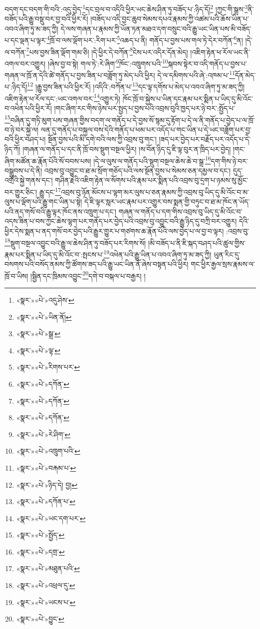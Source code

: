 བདག་དང་བདག་གི་བའི་:འདུ་བྱེད་\footnote{«སྣར་»«པེ་»འདུ་ཤེས་}དང་བྲལ་བ་འདིའི་ཕྱིར་ཡང་ཆེས་ཤིན་ཏུ་བཟོད་པ་:ཉིད་དོ།\footnote{«སྣར་»«པེ་»ཡིན་ནོ།} །ཀྱང་གི་སྒྲས་\footnote{«སྣར་»«པེ་»སྒྲ་}ནི་བཟོད་པའི་རྒྱུ་བསྡུ་བར་བྱ་བའི་ཕྱིར་རོ། །བཟོད་པ་འདི་བྱང་ཆུབ་སེམས་དཔའ་རྣམས་ཀྱི་འཚམ་པའི་ཆོས་ཡིན་པ་འབའ་ཞིག་ཏུ་མ་ཟད་ཀྱི། དེ་ལས་གཞན་པ་རྣམས་ཀྱི་ཡོན་ཏན་མཐའ་དག་བསྲུང་བའི་རྒྱུ་ཡང་ཡིན་པས་མི་བཟོད་པ་དང་ལྡན་པ་ལྟར་\footnote{«སྣར་»«པེ་»ལྟ་}ཁྲོ་བ་ལས་ལྡོག་པར་:རིག་པར་\footnote{«སྣར་»«པེ་»རིགས་པར་}འཆད་པ་ནི། གནོད་པ་བྱས་པས་གལ་ཏེ་དེར་བཀོན་\footnote{«སྣར་»«པེ་»དཀོན་}ན། །དེ་ལ་བཀོན་\footnote{«སྣར་»«པེ་»དཀོན་}པས་བྱས་ཟིན་ལྡོག་གམ་ཅི། །དེ་ཕྱིར་དེ་བཀོན་\footnote{«སྣར་»«པེ་»དཀོན་}ངེས་པར་འདིར་དོན་མེད། །འཇིག་རྟེན་ཕ་རོལ་ཡང་ནི་འགལ་བར་འགྱུར། །ཞེས་བྱ་བ་སྟེ། གལ་ཏེ་:རེ་ཞིག་\footnote{«སྣར་»«པེ་»རེ་ཤིག་}ཁོང་:འཁྲུགས་པའི་\footnote{«སྣར་»«པེ་»འཁྲུག་པའི་}སྐབས་སྟེར་བ་འདི་གནོད་པ་བྱས་པ་གཞན་ལ་ཁྲོ་ན་དེའི་ཚེ་གནོད་པ་བྱས་ཟིན་པ་བཟློག་ཏུ་མེད་པའི་ཕྱིར། དེ་ལ་དམིགས་པའི་ཞེ་:འཁམ་པ་\footnote{«སྣར་»«པེ་»བརྐམ་པ་}དོན་མེད་པ་:ཉིད་དོ།\footnote{«སྣར་»«པེ་»ཉིད་དེ། བྱ།} །རྒྱུ་བྱས་ཟིན་པའི་ཕྱིར་རོ། །འདིའི་:བཀོན་པ་\footnote{«སྣར་»«པེ་»དཀོན་པ་}དང་ལྟ་དགོས་པ་མེད་པ་འབའ་ཞིག་ཏུ་མ་ཟད་ཀྱི། འཇིག་རྟེན་ཕ་རོལ་དང་:ཡང་འགལ་བར་\footnote{«སྣར་»«པེ་»ཡང་དག་པར་}འགྱུར་ཏེ། ཁོང་ཁྲོ་བ་སྐྱེས་པ་ཡིན་དང་རྣམ་པར་སྨིན་པ་ཡིད་དུ་མི་འོང་བ་འཕེན་པའི་ཕྱིར་རོ། །གང་ཞིག་རང་གིས་ཉེས་པར་སྤྱད་པ་བྱས་པའི་འབྲས་བུའི་ཁྱད་པར་ཉེ་བར་:སྤྱོད་པ་\footnote{«སྣར་»«པེ་»སྤྱོད་}བཞིན་དུ་གཏི་མུག་པས་གཞན་གྱིས་བདག་ལ་གནོད་པ་དེ་བྱས་སོ་སྙམ་དུ་རྟོག་པ་དེ་ལ་ནི་གནོད་པ་བྱེད་པ་ལ་ཁྲོ་བ་ཉེ་བར་སྐྱེ་ལ། ལན་དུ་གནོད་པ་བསྐྱལ་བས་དེའི་གནོད་པ་ཕམ་པར་འདོད་པ་གང་ཡིན་པ་དེ་ཡང་བཟློག་པར་བྱ་བའི་ཕྱིར་བཤད་པ། སྔོན་བྱས་པའི་མི་དགེ་བའི་ལས་ཀྱི་འབྲས་བུ་གང་། །ཟད་པར་བྱེད་པར་བརྗོད་པར་འདོད་པ་དེ་ཉིད་ཀོ། །གཞན་ལ་གནོད་པ་དང་ནི་ཁྲོ་བས་སྡུག་བསྔལ་ཕྱིར། །ས་བོན་ཉིད་དུ་ཇི་ལྟ་བུར་ན་ཁྲིད་པར་བྱེད། །གང་ཞིག་མཚོན་ཆ་རྣོན་པོའི་སོ་བབས་པས། །དེ་ལ་ལུས་ལ་གནོད་པའི་སྡུག་བསྔལ་ཆེས་ཆེ་བ་སྒྲ་\footnote{«སྣར་»«པེ་»དགྲ་}དག་གིས་ཉེ་བར་བསྒྲུབས་པ་དེ་ནི། འབྲས་བུ་འབྱུང་བ་ཐ་མ་སྲོག་གཅོད་པའི་ལས་སྔོན་བྱས་པ་སེམས་ཅན་དམྱལ་བ་དང་། དུད་འགྲོའི་སྐྱེ་གནས་དང་། གཤིན་རྗེའི་འཇིག་རྟེན་ལ་སོགས་པའི་རྣམ་པར་སྨིན་པའི་འབྲས་བུ་དྲག་པ་ཉམས་སུ་མྱོང་བར་གྱུར་ཅིང་། རྒྱུ་དང་\footnote{«སྣར་»«པེ་»མཐུན་པའི་}འབྲས་བུ་ཉོན་མོངས་པ་ལྷག་མར་ལུས་པ་ཅན་རྣམས་ཀྱི་འབྲས་བུ་ཡིད་དུ་མི་འོང་བ་མ་ལུས་པ་ལྡོག་པའི་རྒྱུ་གང་ཡིན་པ་སྟེ། དེ་ཇི་ལྟར་སླར་ཡང་རྣམ་པར་འགྱུར་བས་སྨན་གྱི་བཏུང་བ་ཐ་མ་ཁོང་ན་ཡོད་པའི་ནད་གསོ་བའི་རྒྱུ་ལྟར་ཁོང་ནས་འཁྲུག་པ་དང་། གཞན་ལ་གནོད་པ་དག་གིས་འབྲས་བུ་ཡིད་དུ་མི་འོང་བ་འདས་ཟིན་པ་བས་ཀྱང་ཆེས་ལྷག་པར་གནོད་པར་བྱེད་པའི་འབྲས་བུ་འབྱུང་བའི་རྒྱུ་ཉིད་དུ་བཀྲི་བར་འགྱུར། དེའི་ཕྱིར་དེས་སྨན་པ་ནད་གསོ་བར་བྱེད་པའི་རྒྱུར་གྱུར་པ་གཙགས་ཆ་རྣོན་པོའི་ལས་བྱེད་པ་ལ་བྱ་བ་ལྟར། :འབྲས་བུ་\footnote{«སྣར་»«པེ་»འཕྲལ་དུ་}སྡུག་བསྔལ་འབྱུང་བའི་རྒྱུ་ལ་ཆེས་ཤིན་ཏུ་བཟོད་པར་རིགས་སོ། །མི་བཟོད་པ་ནི་ཇི་སྐད་བཤད་པའི་ཚུལ་གྱིས་རྣམ་པར་སྨིན་པ་ཡིད་དུ་མི་འོང་བ་:སྤངས་པ་\footnote{«སྣར་»«པེ་»ཡངས་པ་}འཕེན་པའི་རྒྱུ་ཡིན་པ་འབའ་ཞིག་ཏུ་མ་ཟད་ཀྱི། ཡུན་རིང་དུ་བསགས་པའི་བསོད་ནམས་ཀྱི་ཚོགས་ཟད་པའི་རྒྱུ་ཡང་ཡིན་ནོ་ཞེས་བསྟན་པའི་ཕྱིར། གང་ཕྱིར་རྒྱལ་སྲས་རྣམས་ལ་ཁྲོ་བ་ཡིས། །སྦྱིན་དང་ཁྲིམས་འབྱུང་\footnote{«སྣར་»«པེ་»བྱུང་}དགེ་བ་བསྐལ་པ་བརྒྱར། །
